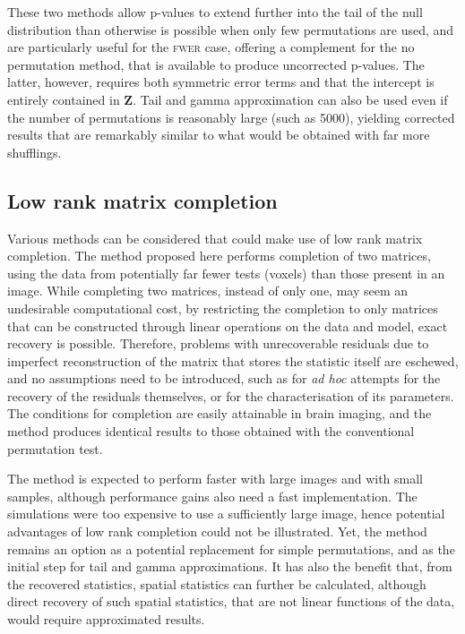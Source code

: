 These two methods allow p-values to extend further into the tail of the null distribution than otherwise is possible when only few permutations are used, and are particularly useful for the \textsc{fwer} case, offering a complement for the no permutation method, that is available to produce uncorrected p-values. The latter, however, requires both symmetric error terms and that the intercept is entirely contained in $\mathbf{Z}$. Tail and gamma approximation can also be used even if the number of permutations is reasonably large (such as 5000), yielding corrected results that are remarkably similar to what would be obtained with far more shufflings.

\subsection{Low rank matrix completion}

Various methods can be considered that could make use of low rank matrix completion. The method proposed here performs completion of two matrices, using the data from potentially far fewer tests (voxels) than those present in an image. While completing two matrices, instead of only one, may seem an undesirable computational cost, by restricting the completion to only matrices that can be constructed through linear operations on the data and model, exact recovery is possible. Therefore, problems with unrecoverable residuals due to imperfect reconstruction of the matrix that stores the statistic itself are eschewed, and no assumptions need to be introduced, such as for \emph{ad hoc} attempts for the recovery of the residuals themselves, or for the characterisation of its parameters. The conditions for completion are easily attainable in brain imaging, and the method produces identical results to those obtained with the conventional permutation test.

The method is expected to perform faster with large images and with small samples, although performance gains also need a fast implementation. The simulations were too expensive to use a sufficiently large image, hence potential advantages of low rank completion could not be illustrated. Yet, the method remains an option as  a potential replacement for simple permutations, and as the initial step for tail and gamma approximations. It has also the benefit that, from the recovered statistics, spatial statistics can further be calculated, although direct recovery of such spatial statistics, that are not linear functions of the data, would require approximated results.

